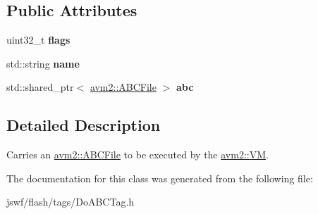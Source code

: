 \subsection*{Public Attributes}
\begin{DoxyCompactItemize}
\item 
\hypertarget{classjswf_1_1flash_1_1tags_1_1_do_a_b_c_tag_a092de318a6947b04ab94dfd663a33e72}{uint32\+\_\+t {\bfseries flags}}\label{classjswf_1_1flash_1_1tags_1_1_do_a_b_c_tag_a092de318a6947b04ab94dfd663a33e72}

\item 
\hypertarget{classjswf_1_1flash_1_1tags_1_1_do_a_b_c_tag_ab890fd63f6ae2d3f9cd2138d85bf3c87}{std\+::string {\bfseries name}}\label{classjswf_1_1flash_1_1tags_1_1_do_a_b_c_tag_ab890fd63f6ae2d3f9cd2138d85bf3c87}

\item 
\hypertarget{classjswf_1_1flash_1_1tags_1_1_do_a_b_c_tag_ac21ee7ac4ac727b73faadd9f4cbc8be6}{std\+::shared\+\_\+ptr$<$ \hyperlink{classjswf_1_1avm2_1_1_a_b_c_file}{avm2\+::\+A\+B\+C\+File} $>$ {\bfseries abc}}\label{classjswf_1_1flash_1_1tags_1_1_do_a_b_c_tag_ac21ee7ac4ac727b73faadd9f4cbc8be6}

\end{DoxyCompactItemize}


\subsection{Detailed Description}
Carries an {\ttfamily \hyperlink{classjswf_1_1avm2_1_1_a_b_c_file}{avm2\+::\+A\+B\+C\+File}} to be executed by the \hyperlink{classjswf_1_1avm2_1_1_v_m}{avm2\+::\+V\+M}. 

The documentation for this class was generated from the following file\+:\begin{DoxyCompactItemize}
\item 
jswf/flash/tags/Do\+A\+B\+C\+Tag.\+h\end{DoxyCompactItemize}
